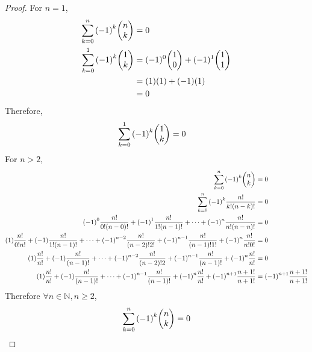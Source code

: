 \documentclass[]{article}
\newcommand{\N}{\mathbb{N}}
\begin{document}
\begin{proof}
    For $n=1$,
    \begin{align*}
        \sum_{k=0}^{n} \qty(-1)^k \mqty(n\\k) &= 0\\
        \sum_{k=0}^{1} \qty(-1)^k \mqty(1\\k) 
            &= (-1)^0 \mqty(1\\0) + (-1)^1 \mqty(1\\1)\\
            &= (1)(1) + (-1) (1)\\
            &=0
    \end{align*}
    Therefore,
    \begin{align*}
        \sum_{k=0}^{1} \qty(-1)^k \mqty(1\\k) &= 0
    \end{align*}
    For $n>2$,
    \begin{align*}
        \sum_{k=0}^{n} \qty(-1)^k \mqty(n\\k) &= 0\\
        \sum_{k=0}^{n} \qty(-1)^k \frac{n!}{k!(n-k)!} &= 0\\
        \qty(-1)^0 \frac{n!}{0!(n-0)!} + \qty(-1)^1 \frac{n!}{1!(n-1)!} + \cdots +
            \qty(-1)^n \frac{n!}{n!(n-n)!} &= 0\\
        (1)\frac{n!}{0!n!} + (-1) \frac{n!}{1!(n-1)!} + \cdots +
            \qty(-1)^{n-2} \frac{n!}{(n-2)!2!} + \qty(-1)^{n-1} \frac{n!}{(n-1)!1!} + 
            \qty(-1)^n \frac{n!}{n!0!}&=0\\
        (1)\frac{n!}{n!} + (-1) \frac{n!}{(n-1)!} + \cdots +
            \qty(-1)^{n-2} \frac{n!}{(n-2)!2} + \qty(-1)^{n-1} \frac{n!}{(n-1)!} 
            + \qty(-1)^n \frac{n!}{n!}&=0\\
        (1)\frac{n!}{n!} + (-1) \frac{n!}{(n-1)!} + \cdots + 
            \qty(-1)^{n-1} \frac{n!}{(n-1)!} + \qty(-1)^{n} \frac{n!}{n!} +
            \qty(-1)^{n+1} \frac{n+1!}{n+1!}&= \qty(-1)^{n+1} \frac{n+1!}{n+1!}\\
    \end{align*}
    Therefore $\forall n \in \N, n \geq 2$,
    $$\sum_{k=0}^{n} \qty(-1)^k \mqty(n\\k) = 0$$
\end{proof}

\newpage
\end{document}
